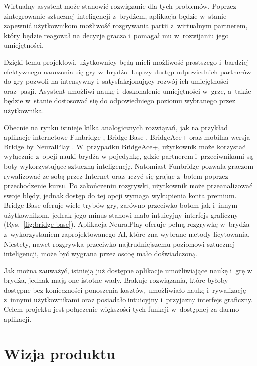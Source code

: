 Wirtualny asystent może stanowić rozwiązanie dla tych problemów. Poprzez
zintegrowanie sztucznej inteligencji z~brydżem, aplikacja będzie w~stanie
zapewnić użytkownikom możliwość
rozgrywania partii z~wirtualnym partnerem, który będzie reagował na decyzje
gracza i~pomagał mu w~rozwijaniu jego umiejętności.

Dzięki temu projektowi, użytkownicy będą mieli możliwość prostszego i~bardziej
efektywnego nauczania się gry w~brydża. Lepszy dostęp odpowiednich partnerów
do gry pozwoli na intensywny i~satysfakcjonujący rozwój ich
umiejętności oraz~pasji. Asystent umożliwi naukę
i~doskonalenie umiejętności w~grze, a~także będzie w~stanie dostosować
się do odpowiedniego poziomu wybranego przez użytkownika.
\newline

Obecnie na rynku istnieje kilka analogicznych rozwiązań, jak na przykład
aplikacje internetowe Funbridge \cite{funbridge}, Bridge Base \cite{bridgebase},
BridgeAce+ \cite{bridgeace} oraz mobilna wersja Bridge by NeuralPlay
\cite{neuralplay}. W~przypadku BridgeAce+, użytkownik może korzystać wyłącznie
z~opcji nauki brydża w pojedynkę, gdzie partnerem i~przeciwnikami są boty
wykorzystujące sztuczną inteligencję. Natomiast Funbridge pozwala graczom
rywalizować ze sobą przez Internet oraz uczyć się grając z~botem poprzez
przechodzenie kursu. Po zakończeniu rozgrywki, użytkownik może przeanalizować
swoje błędy, jednak dostęp do tej opcji wymaga wykupienia konta premium.
Bridge Base oferuje wiele trybów gry, zarówno przeciwko botom jak i~innym
użytkownikom, jednak jego minus stanowi mało intuicyjny interfejs graficzny
(Rys.~\ref{fig:bridge-base}). Aplikacja NeuralPlay oferuje pełną rozgrywkę w~brydża
z~wykorzystaniem zaprojektowanego AI, które zna wybrane metody licytowania.
Niestety, nawet rozgrywka przeciwko najtrudniejszemu poziomowi sztucznej
inteligencji, może być wygrana przez osobę mało doświadczoną.
\newline

Jak można zauważyć, istnieją już dostępne aplikacje umożliwiające naukę
i~grę w brydża, jednak mają one istotne wady. Brakuje rozwiązania, które
byłoby dostępne bez konieczności ponoszenia kosztów, umożliwiało naukę
i~rywalizację z~innymi użytkownikami oraz posiadało intuicyjny i~przyjazny
interfejs graficzny. Celem projektu jest połączenie większości tych funkcji
w~dostępnej za darmo aplikacji.



\FloatBarrier

\section{Wizja produktu}


